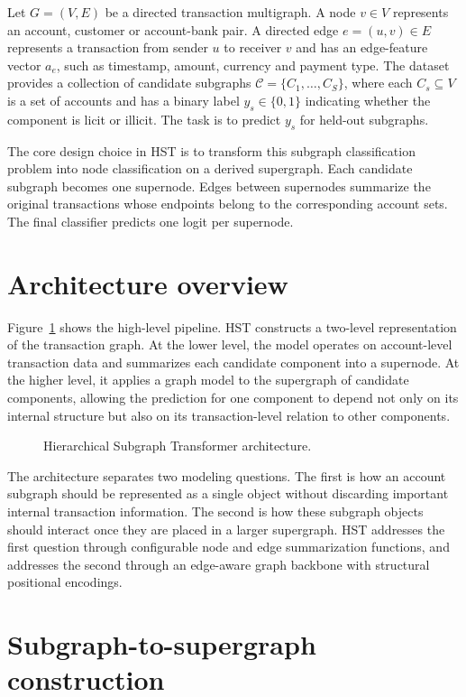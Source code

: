 \documentclass[12pt, twocolumn]{report}
\begin{document}
Let $G=(V,E)$ be a directed transaction multigraph. A node $v\in V$ represents an account, customer or account-bank pair. A directed edge $e=(u,v)\in E$ represents a transaction from sender $u$ to receiver $v$ and has an edge-feature vector $a_e$, such as timestamp, amount, currency and payment type. The dataset provides a collection of candidate subgraphs $\mathcal{C}=\{C_1,\ldots,C_S\}$, where each $C_s\subseteq V$ is a set of accounts and has a binary label $y_s\in\{0,1\}$ indicating whether the component is licit or illicit. The task is to predict $y_s$ for held-out subgraphs.

The core design choice in HST is to transform this subgraph classification problem into node classification on a derived supergraph. Each candidate subgraph becomes one supernode. Edges between supernodes summarize the original transactions whose endpoints belong to the corresponding account sets. The final classifier predicts one logit per supernode.

\section{Architecture overview}

Figure~\ref{fig:hst-overview} shows the high-level pipeline. HST constructs a two-level representation of the transaction graph. At the lower level, the model operates on account-level transaction data and summarizes each candidate component into a supernode. At the higher level, it applies a graph model to the supergraph of candidate components, allowing the prediction for one component to depend not only on its internal structure but also on its transaction-level relation to other components.

\begin{figure}[t]
    \centering
    \caption{Hierarchical Subgraph Transformer architecture.}
    \label{fig:hst-overview}
\end{figure}

The architecture separates two modeling questions. The first is how an account subgraph should be represented as a single object without discarding important internal transaction information. The second is how these subgraph objects should interact once they are placed in a larger supergraph. HST addresses the first question through configurable node and edge summarization functions, and addresses the second through an edge-aware graph backbone with structural positional encodings.

\section{Subgraph-to-supergraph construction}
\end{document}
